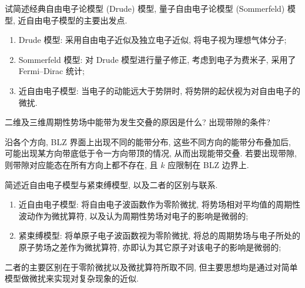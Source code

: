 \documentclass[UTF8]{ctexart}
\newenvironment{Answer}{}{}
\begin{document}
\begin{Question}
            \item 试简述经典自由电子论模型 (Drude) 模型, 量子自由电子论模型 (Sommerfeld) 模型, 近自由电子模型的主要出发点.

\begin{Answer}
    \begin{Solve}[Solve:]
        \vspace*{-1.7em}
        \begin{enumerate}
            \item Drude 模型: 采用自由电子近似及独立电子近似, 将电子视为理想气体分子;
            \item Sommerfeld 模型: 对 Drude 模型进行量子修正, 考虑到电子为费米子, 采用了 Fermi--Dirac 统计;
            \item 近自由电子模型: 当电子的动能远大于势阱时, 将势阱的起伏视为对自由电子的微扰.
        \end{enumerate}
    \end{Solve}
\end{Answer}

            \item 二维及三维周期性势场中能带为发生交叠的原因是什么? 出现带隙的条件?

\begin{Answer}
    \begin{Solve}[Solve:]
        \hspace*{2em}沿各个方向, BLZ 界面上出现不同的能带分布, 这些不同方向的能带分布叠加后, 可能出现某方向带底低于令一方向带顶的情况, 从而出现能带交叠. 若要出现带隙, 则带隙对应能态在所有方向上都不存在, 且 $k$ 应限制在 BLZ 边界上.
    \end{Solve}
\end{Answer}

            \item 简述近自由电子模型与紧束缚模型, 以及二者的区别与联系.

\begin{Answer}
    \begin{Solve}[Solve:]
        \vspace*{-1.7em}
        \begin{enumerate}
            \item 近自由电子模型: 将自由电子波函数作为零阶微扰, 将势场相对平均值的周期性波动作为微扰算符, 以及认为周期性势场对电子的影响是微弱的;
            \item 紧束缚模型: 将单原子电子波函数视为零阶微扰, 将总的周期势场与电子所处的原子势场之差作为微扰算符, 亦即认为其它原子对该电子的影响是微弱的;
        \end{enumerate}
        二者的主要区别在于零阶微扰以及微扰算符所取不同, 但主要思想均是通过对简单模型做微扰来实现对复杂现象的近似.
    \end{Solve}
\end{Answer}


\end{Question}
\end{document}
